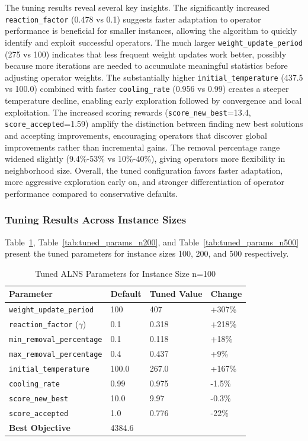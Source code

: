 \documentclass[a4paper]{scrartcl}
\begin{document}
The tuning results reveal several key insights.
The significantly increased \texttt{reaction\_factor} (0.478 vs 0.1) suggests faster adaptation to operator performance
is beneficial for smaller instances, allowing the algorithm to quickly identify and exploit successful operators.
The much larger \texttt{weight\_update\_period} (275 vs 100) indicates that less frequent weight updates work better,
possibly because more iterations are needed to accumulate meaningful statistics before adjusting operator weights.
The substantially higher \texttt{initial\_temperature} (437.5 vs 100.0) combined with faster \texttt{cooling\_rate}
(0.956 vs 0.99) creates a steeper temperature decline, enabling early exploration followed by convergence and local exploitation.
The increased scoring rewards (\texttt{score\_new\_best}=13.4, \texttt{score\_accepted}=1.59) amplify the distinction
between finding new best solutions and accepting improvements, encouraging operators that discover global improvements
rather than incremental gains.
The removal percentage range widened slightly (9.4\%-53\% vs 10\%-40\%), giving operators more flexibility in neighborhood size.
Overall, the tuned configuration favors faster adaptation, more aggressive exploration early on, and stronger
differentiation of operator performance compared to conservative defaults.

\subsubsection{Tuning Results Across Instance Sizes}

Table~\ref{tab:tuned_params_n100}, Table~\ref{tab:tuned_params_n200}, and Table~\ref{tab:tuned_params_n500} present 
the tuned parameters for instance sizes 100, 200, and 500 respectively.

\begin{table}[H]
\centering
\caption{Tuned ALNS Parameters for Instance Size n=100}
\label{tab:tuned_params_n100}
\begin{tabular}{l l l l}
\toprule
Parameter & Default & Tuned Value & Change \\
\midrule
\texttt{weight\_update\_period} & 100 & 407 & +307\% \\
\texttt{reaction\_factor} ($\gamma$) & 0.1 & 0.318 & +218\% \\
\texttt{min\_removal\_percentage} & 0.1 & 0.118 & +18\% \\
\texttt{max\_removal\_percentage} & 0.4 & 0.437 & +9\% \\
\texttt{initial\_temperature} & 100.0 & 267.0 & +167\% \\
\texttt{cooling\_rate} & 0.99 & 0.975 & -1.5\% \\
\texttt{score\_new\_best} & 10.0 & 9.97 & -0.3\% \\
\texttt{score\_accepted} & 1.0 & 0.776 & -22\% \\
\midrule
\textbf{Best Objective} & \multicolumn{3}{l}{4384.6} \\
\bottomrule
\end{tabular}
\end{table}
\end{document}
